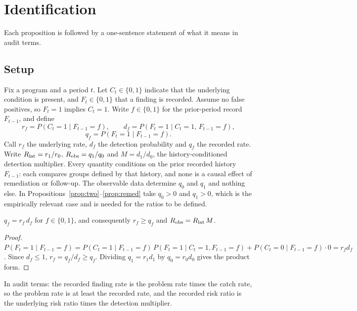 \section{Identification}\label{app:id}

Each proposition is followed by a one-sentence statement of what it means in
audit terms.

\subsection{Setup}

Fix a program and a period $t$. Let $C_t \in \{0,1\}$ indicate that the
underlying condition is present, and $F_t \in \{0,1\}$ that a finding is
recorded. Assume no false positives, so $F_t = 1$ implies $C_t = 1$. Write
$f \in \{0,1\}$ for the prior-period record $F_{t-1}$, and define
%
\[
  r_f = P(C_t = 1 \mid F_{t-1} = f), \qquad
  d_f = P(F_t = 1 \mid C_t = 1,\, F_{t-1} = f),
\]
\[
  q_f = P(F_t = 1 \mid F_{t-1} = f).
\]
%
Call $r_f$ the underlying rate, $d_f$ the detection probability and $q_f$ the
recorded rate. Write $R_{\mathrm{lat}} = r_1/r_0$, $R_{\mathrm{obs}} = q_1/q_0$ and $M = d_1/d_0$,
the history-conditioned detection multiplier. Every quantity conditions on
the prior recorded history $F_{t-1}$: each compares groups defined by that
history, and none is a causal effect of remediation or follow-up.
The observable data determine $q_0$ and $q_1$ and nothing else. In
Propositions~\ref{prop:two}--\ref{prop:remed} take $q_0 > 0$ and $q_1 > 0$,
which is the empirically relevant case and is needed for the ratios to be
defined.

\begin{proposition}\label{prop:two}
$q_f = r_f\,d_f$ for $f \in \{0,1\}$, and consequently $r_f \geq q_f$ and
$R_{\mathrm{obs}} = R_{\mathrm{lat}} \, M$.
\end{proposition}

\begin{proof}
$P(F_t=1 \mid F_{t-1}=f) = P(C_t=1 \mid F_{t-1}=f)\,P(F_t=1 \mid C_t=1,F_{t-1}=f)
+ P(C_t=0 \mid F_{t-1}=f)\cdot 0 = r_f d_f$. Since $d_f \leq 1$,
$r_f = q_f/d_f \geq q_f$. Dividing $q_1 = r_1 d_1$ by $q_0 = r_0 d_0$ gives
the product form.
\end{proof}

In audit terms: the recorded finding rate is the problem rate times the catch
rate, so the problem rate is at least the recorded rate, and the recorded risk
ratio is the underlying risk ratio times the detection multiplier.

